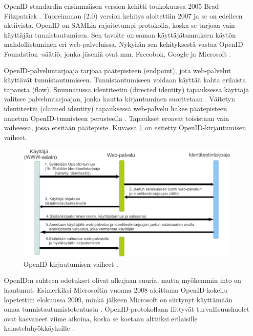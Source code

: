 OpenID standardin ensimmäisen version kehitti toukokuussa 2005 Brad Fitzpatrick \cite{openid}. Tuoreimman (2.0) version kehitys aloitettiin 2007 ja se on edelleen aktiivista. OpenID on SAMLia rajoitetumpi protokolla, koska se tarjoaa vain käyttäjän tunnistautumisen. Sen tavoite on saman käyttäjätunnuksen käytön mahdollistaminen eri web-palveluissa. Nykyään sen kehityksestä vastaa \mbox{OpenID} Foundation -säätiö, jonka jäseniä ovat mm. Faceobok, Google ja Microsoft \cite{openid_foundation}.

OpenID-palveluntarjoaja tarjoaa päätepisteen (endpoint), jota web-palvelut käyttävät tunnistautumiseen. Tunnistautumiseen voidaan käyttää kahta erilaista tapausta (flow). Suunnatussa identiteetin (directed identity) tapauksessa käyttäjä valitsee palveluntarjoajan, jonka kautta kirjautuminen suoritetaan \cite{openid}. Väitetyn identiteetin (claimed identity) tapauksessa web-palvelu hakee päätepisteen annetun OpenID\--tun\-nis\-teen perusteella \cite{openid}. Tapaukset eroavat toisistaan vain vaiheessa, jossa etsitään päätepiste. Kuvassa \ref{openid_flow} on esitetty OpenID-kirjautumisen vaiheet.

\begin{figure}[ht]
\centering
\includegraphics[width=\textwidth]{teknologiat/protokollat/openid.eps}
\caption{OpenID-kirjautumisen vaiheet \cite{openid}.}%
\label{openid_flow}
\end{figure}

OpenID:n suhteen odotukset olivat alkujaan suuria, mutta myöhemmin into on laantunut. Esimerkiksi Microsoftin vuonna 2008 aloittama OpenID-kokeilu lopetettiin elokuussa 2009, minkä jälkeen Microsoft on siirtynyt käyttämään omaa tunnistautumistoteutusta \cite{openid_microsoft}. OpenID-protokollaan liittyvät turvallisuushuolet ovat kasvaneet viime aikoina, koska se koetaan alttiiksi erilaisille kalasteluhyökkäyksille \cite{billion_keys}.

